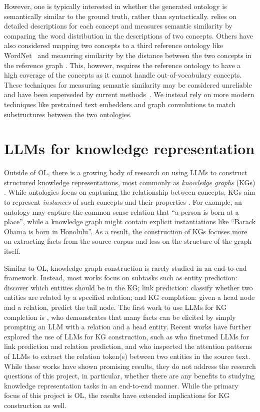 However, one is typically interested in whether the generated ontology is semantically similar to the ground truth, rather than syntactically. \citet{Zavitsanos2011GoldSE} relies on detailed descriptions for each concept and measures semantic similarity by comparing the word distribution in the descriptions of two concepts. Others have also considered mapping two concepts to a third reference ontology like WordNet~\cite{maedche2002measuring} and measuring similarity by the distance between the two concepts in the reference graph \cite{Treeratpituk2013GraphbasedAT}. This, however, requires the reference ontology to have a high coverage of the concepts as it cannot handle out-of-vocabulary concepts. These techniques for measuring semantic similarity may be considered unreliable and have been superseded by current methods~\cite{conneau2017supervised}. We instead rely on more modern techniques like pretrained text embedders \cite{devlin2018bert} and graph convolutions \cite{kipf2016semi} to match substructures between the two ontologies.

\section{LLMs for knowledge representation}

Outside of OL, there is a growing body of research on using LLMs to construct structured knowledge representations, most commonly as \emph{knowledge graphs} (KGs) \cite{singhal2012introducing}. While ontologies focus on capturing the relationship between concepts, KGs aim to represent \emph{instances} of such concepts and their properties \cite{guarino1995ontologies}. For example, an ontology may capture the common sense relation that ``a person is born at a place'', while a knowledge graph might contain explicit instantiations like ``Barack Obama is born in Honolulu''. As a result, the construction of KGs focuses more on extracting facts from the source corpus and less on the structure of the graph itself.

Similar to OL, knowledge graph construction is rarely studied in an end-to-end framework. Instead, most works focus on subtasks such as entity prediction: discover which entities should be in the KG; link prediction: classify whether two entities are related by a specified relation; and KG completion: given a head node and a relation, predict the tail node.  The first work to use LLMs for KG completion is \citet{petroni2019language}, who demonstrates that many facts can be elicited by simply prompting an LLM with a relation and a head entity. Recent works have further explored the use of LLMs for KG construction, such as \citet{yao2023exploring} who finetuned LLMs for link prediction and relation prediction, and \citet{wang2020language} who inspected the attention patterns of LLMs to extract the relation token(s) between two entities in the source text. While these works have shown promising results, they do not address the research questions of this project, in particular, whether there are any benefits to studying knowledge representation tasks in an end-to-end manner. While the primary focus of this project is OL, the results have extended implications for KG construction as well.

